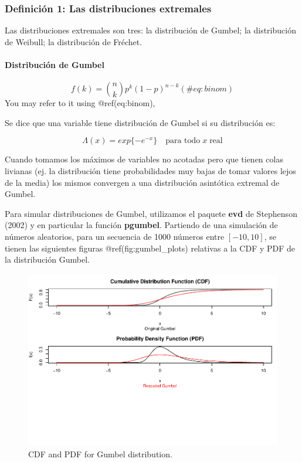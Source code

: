 \documentclass[
  12pt]{article}
\begin{document}
\newpage

\hypertarget{definiciuxf3n-1-las-distribuciones-extremales}{%
\subsubsection{Definición 1: Las distribuciones
extremales}\label{definiciuxf3n-1-las-distribuciones-extremales}}

Las distribuciones extremales son tres: la distribución de Gumbel; la
distribución de Weibull; la distribución de Fréchet.

\hypertarget{distribuciuxf3n-de-gumbel}{%
\paragraph{Distribución de Gumbel}\label{distribuciuxf3n-de-gumbel}}

\begin{equation} 
  f\left(k\right) = \binom{n}{k} p^k\left(1-p\right)^{n-k}
  (\#eq:binom)
\end{equation} You may refer to it using @ref(eq:binom),

Se dice que una variable tiene distribución de Gumbel si su distribución
es:

\[ \Lambda(x) = exp\{-e^{-x}\} \quad\text{para todo}\; x \;\text{real} \]

Cuando tomamos los máximos de variables no acotadas pero que tienen
colas livianas (ej. la distribución tiene probabilidades muy bajas de
tomar valores lejos de la media) los mismos convergen a una distribución
asintótica extremal de Gumbel.

Para simular distribuciones de Gumbel, utilizamos el paquete
\textbf{evd} de Stephenson (2002) y en particular la función
\textbf{pgumbel}. Partiendo de una simulación de números aleatorios,
para un secuencia de 1000 números entre \([-10,10]\), se tienen las
siguientes figuras @ref(fig:gumbel\_plots) relativas a la CDF y PDF de
la distribución Gumbel.

\begin{figure}
\centering
\includegraphics{extremales_files/figure-latex/gumbel_plots-1.pdf}
\caption{CDF and PDF for Gumbel distribution.}
\end{figure}
\end{document}
